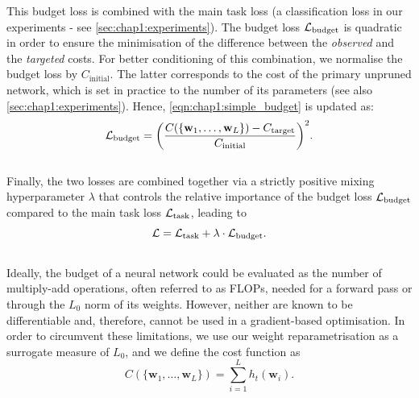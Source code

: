 \noindent This budget loss is combined with the main task loss (a classification
loss in our experiments - see \cref{sec:chap1:experiments}). The budget loss $
{\cal L}_\text{budget}$ is quadratic in order to ensure the minimisation of the
difference between the {\em observed} and the {\em targeted} costs. For better
conditioning of this combination, we normalise the budget loss by
$C_\text{initial}$. The latter corresponds to the cost of the primary unpruned
network, which is set in practice to the number of its parameters (see also
\cref{sec:chap1:experiments}). Hence, \cref{eqn:chap1:simple_budget} is updated
as:\\

\begin{equation}
  \label{eqn:chap1:real_budget}
  {\cal L}_\text{budget} = \biggl( \displaystyle\frac{C(\{\mathbf{w}_1,\dots, \mathbf{w}_L\}) - C_\text{target}}{C_\text{initial}} \biggr)^2.
\end{equation}\\

Finally, the two losses are combined together via a strictly positive mixing
hyperparameter $\lambda$ that  controls the relative importance of  the budget loss
${\cal L}_\text{budget}$ compared to the main task loss ${\cal L}_\text{task}$,
leading to\\

\begin{equation}
  \label{eqn:chap1:globalloss}
   {\cal L} =  {\cal L}_\text{task} + \lambda \cdot {\cal L}_\text{budget}.
\end{equation} \\

Ideally, the budget of a neural network could be evaluated as the number of
multiply-add operations, often referred to as \acp{FLOP}, needed for a forward
pass or through the $L_0$ norm of its weights. However, neither are known to
be differentiable and, therefore, cannot be used in a gradient-based
optimisation. In order to circumvent these limitations, we use our weight
reparametrisation as a surrogate measure of $L_0$, and we define the cost
function as \\

\begin{equation}
  \label{eqn:chap1:cost_function}
  C(\{\mathbf{w}_1,\dots, \mathbf{w}_L\}) = \displaystyle \sum_{i=1}^{L} h_t(\mathbf{w}_i). 
\end{equation} \\


